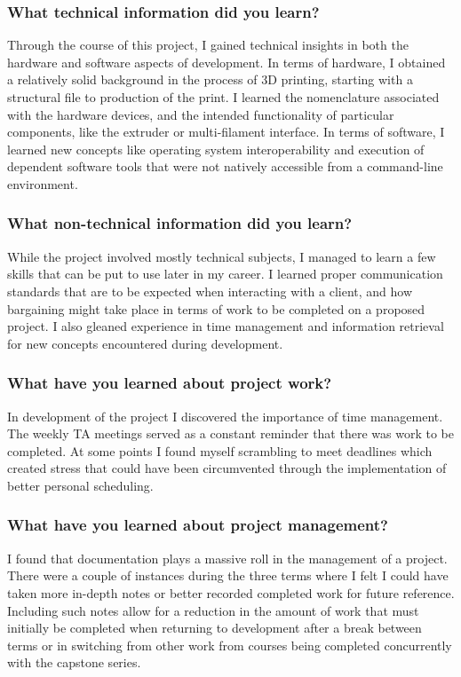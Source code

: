\subsubsection{What technical information did you learn?}
Through the course of this project, I gained technical insights in both the hardware and software aspects of development. In terms of hardware, I obtained a relatively solid background in the process of 3D printing, starting with a structural file to production of the print. I learned the nomenclature associated with the hardware devices, and the intended functionality of particular components, like the extruder or multi-filament interface. In terms of software, I learned new concepts like operating system interoperability and execution of dependent software tools that were not natively accessible from a command-line environment.
\subsubsection{What non-technical information did you learn?}
While the project involved mostly technical subjects, I managed to learn a few skills that can be put to use later in my career. I learned proper communication standards that are to be expected when interacting with a client, and how bargaining might take place in terms of work to be completed on a proposed project. I also gleaned experience in time management and information retrieval for new concepts encountered during development.
\subsubsection{What have you learned about project work?}
In development of the project I discovered the importance of time management. The weekly TA meetings served as a constant reminder that there was work to be completed. At some points I found myself scrambling to meet deadlines which created stress that could have been circumvented through the implementation of better personal scheduling.
\subsubsection{What have you learned about project management?}
I found that documentation plays a massive roll in the management of a project. There were a couple of instances during the three terms where I felt I could have taken more in-depth notes or better recorded completed work for future reference. Including such notes allow for a reduction in the amount of work that must initially be completed when returning to development after a break between terms or in switching from other work from courses being completed concurrently with the capstone series.

